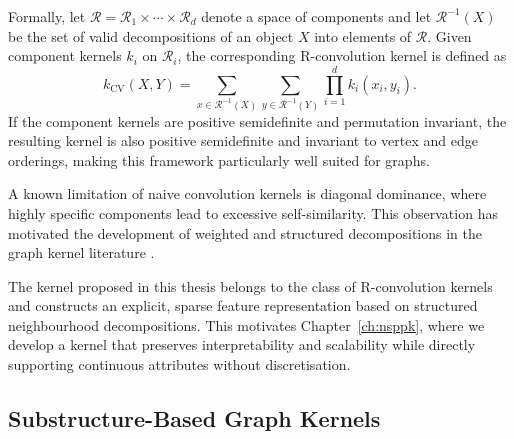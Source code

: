 Formally, let $\mathcal{R}=\mathcal{R}_1\times\cdots\times\mathcal{R}_d$ denote a
space of components and let $\mathcal{R}^{-1}(X)$ be the set of valid
decompositions of an object $X$ into elements of $\mathcal{R}$. Given component
kernels $k_i$ on $\mathcal{R}_i$, the corresponding R-convolution kernel is
defined as
\[
k_{\mathrm{CV}}(X,Y)
=
\sum_{x\in \mathcal{R}^{-1}(X)}
\sum_{y\in \mathcal{R}^{-1}(Y)}
\prod_{i=1}^d k_i(x_i,y_i).
\]
If the component kernels are positive semidefinite and permutation invariant,
the resulting kernel is also positive semidefinite and invariant to vertex and
edge orderings, making this framework particularly well suited for graphs.

A known limitation of naive convolution kernels is diagonal dominance, where
highly specific components lead to excessive self-similarity. This observation
has motivated the development of weighted and structured decompositions in the
graph kernel literature \citep{kriege2020survey}.

The kernel proposed in this thesis belongs to the class of R-convolution kernels
and constructs an explicit, sparse feature representation based on structured
neighbourhood decompositions. This motivates Chapter~\ref{ch:nsppk}, where we develop a
kernel that preserves interpretability and scalability while directly supporting
continuous attributes without discretisation.


\subsection{Substructure-Based Graph Kernels}

